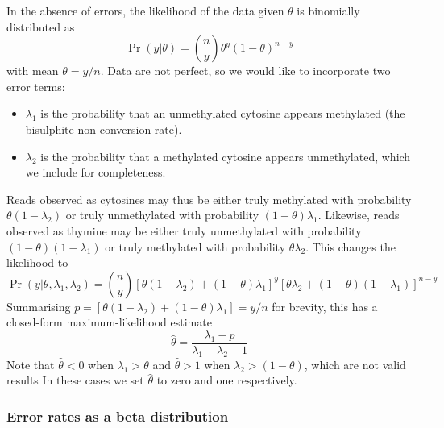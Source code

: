 \documentclass[twocolumn,twoside,lettersize]{article}
\begin{document}
In the absence of errors, the likelihood of the data given $\theta$ is binomially distributed as
\begin{equation}
    \label{eqn:classic-binomial}
    \Pr(y| \theta) = {n \choose y} \theta^y(1-\theta)^{n-y}
\end{equation}
with mean $\theta=y/n$.
Data are not perfect, so we would like to incorporate two error terms:
\begin{itemize}
    \item $\lambda_1$ is the probability that an unmethylated cytosine appears methylated (the bisulphite non-conversion rate).
    \item $\lambda_2$ is the probability that a methylated cytosine appears unmethylated, which we include for completeness.
\end{itemize}
Reads observed as cytosines may thus be either truly methylated with probability $\theta(1-\lambda_2)$ or truly unmethylated with probability $(1-\theta)\lambda_1$. Likewise, reads observed as thymine may be either truly unmethylated with probability $(1-\theta)(1-\lambda_1)$ or truly methylated with probability $\theta \lambda_2$.
This changes the likelihood to
\begin{equation}
    \label{eqn:binom-with-errors}
    \Pr(y | \theta, \lambda_1, \lambda_2) = 
    {n \choose y}
    [\theta(1-\lambda_2) + (1-\theta)\lambda_1]^y
    [\theta \lambda_2 + (1-\theta)(1-\lambda_1)]^{n-y}
\end{equation}
Summarising $p=[\theta(1-\lambda_2) + (1-\theta)\lambda_1] = y/n$ for brevity, this has a closed-form maximum-likelihood estimate
\begin{equation}
    \label{eqn:ml-theta}
    \hat{\theta} = \frac{\lambda_1-p}{\lambda_1 + \lambda_2 -1}
\end{equation}
Note that $\hat{\theta}<0$ when $\lambda_1 > \theta$ and $\hat{\theta}>1$ when $\lambda_2 > (1-\theta)$, which are not valid results
In these cases we set $\hat{\theta}$ to zero and one respectively.

\subsubsection{Error rates as a beta distribution} \label{sec:mean-as-beta}
\end{document}

